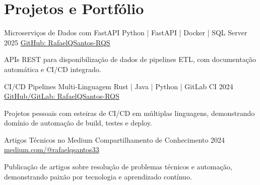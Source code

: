 \section{\textbf{Projetos e Portfólio}}
\resumeSubHeadingListStart
\resumeProject
{Microserviços de Dados com FastAPI}
{Python | FastAPI | Docker | SQL Server}
{2025}
{\href{https://github.com/RafaelQSantos-RQS}{GitHub: RafaelQSantos-RQS}}
\resumeItemListStart
\item {APIs REST para disponibilização de dados de pipelines ETL, com documentação automática e CI/CD integrado.}
\resumeItemListEnd

\resumeProject
{CI/CD Pipelines Multi-Linguagem}
{Rust | Java | Python | GitLab CI}
{2024}
{\href{https://github.com/RafaelQSantos-RQS}{GitHub/GitLab: RafaelQSantos-RQS}}
\resumeItemListStart
\item {Projetos pessoais com esteiras de CI/CD em múltiplas linguagens, demonstrando domínio de automação de build, testes e deploy.}
\resumeItemListEnd

\resumeProject
{Artigos Técnicos no Medium}
{Compartilhamento de Conhecimento}
{2024}
{\href{https://medium.com/@rafaelqsantos33}{medium.com/@rafaelqsantos33}}
\resumeItemListStart
\item {Publicação de artigos sobre resolução de problemas técnicos e automação, demonstrando paixão por tecnologia e aprendizado contínuo.}
\resumeItemListEnd

\resumeSubHeadingListEnd
\vspace{-5.5mm}


